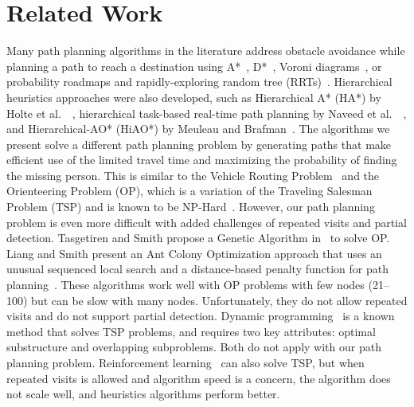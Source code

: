 \section{Related Work}
\label{sec:RelatedWork}

Many path planning algorithms in the literature address obstacle avoidance while planning a path to reach a destination using A*~\cite{Quigley2005Towards}, D*~\cite{Stentz1997Optimal}, Voroni diagrams~\cite{Bortoff2000Path}, or probability roadmaps and rapidly-exploring random tree (RRTs)~\cite{Pettersson2006Probabilistic}. Hierarchical heuristics approaches were also developed, such as Hierarchical A* (HA*) by Holte et al.\ ~\cite{Holte1996Hierarchical}, hierarchical task-based real-time path planning by Naveed et al.\ ~\cite{Meuleau2007Hierarchical}, and Hierarchical-AO* (HiAO*) by Meuleau and Brafman~\cite{Naveed2010Hierarchical}. The algorithms we present solve a different path planning problem by generating paths that make efficient use of the limited travel time and maximizing the probability of finding the missing person. This is similar to the Vehicle Routing Problem~\cite{Laporte1992Vehicle} and the Orienteering Problem (OP), which is a variation of the Traveling Salesman Problem (TSP) and is known to be NP-Hard~\cite{Sokkappa1990Cost}. However, our path planning problem is even more difficult with added challenges of repeated visits and partial detection. 
Tasgetiren and Smith propose a Genetic Algorithm in~\cite{Tasgetiren2000Genetic} to solve OP. Liang and Smith present an Ant Colony Optimization approach that uses an unusual sequenced local search and a distance-based penalty function for path planning~\cite{Liang2006Ant}. These algorithms work well with OP problems with few nodes (21--100) but can be slow with many nodes. Unfortunately, they do not allow repeated visits and do not support partial detection. Dynamic programming~\cite{Sniedovich2010Dynamic} is a known method that solves TSP problems, and requires two key attributes: optimal substructure and overlapping subproblems. Both do not apply with our path planning problem. Reinforcement learning~\cite{Russell2009Artificial} can also solve TSP, but when repeated visits is allowed and algorithm speed is a concern, the algorithm does not scale well, and heuristics algorithms perform better.

